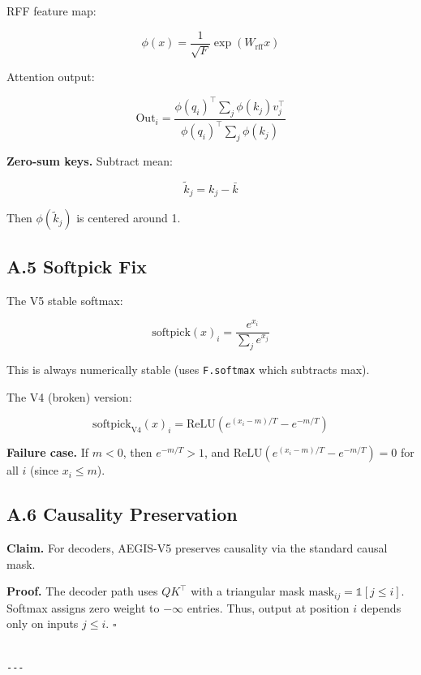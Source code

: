 RFF feature map:

\[
\phi(x) = \frac{1}{\sqrt{F}} \exp(W_\text{rff} x)
\]

Attention output:

\[
\text{Out}_i = \frac{\phi(q_i)^\top \sum_j \phi(k_j) v_j^\top}{\phi(q_i)^\top \sum_j \phi(k_j)}
\]

\textbf{Zero-sum keys.} Subtract mean:

\[
\tilde{k}_j = k_j - \bar{k}
\]

Then $\phi(\tilde{k}_j)$ is centered around 1.

\subsection{A.5 Softpick Fix}

The V5 stable softmax:

\[
\text{softpick}(x)_i = \frac{e^{x_i}}{\sum_j e^{x_j}}
\]

This is always numerically stable (uses \texttt{F.softmax} which subtracts max).

The V4 (broken) version:

\[
\text{softpick}_\text{V4}(x)_i = \text{ReLU}\!\left(e^{(x_i - m)/T} - e^{-m/T}\right)
\]

\textbf{Failure case.} If $m < 0$, then $e^{-m/T} > 1$, and 
$\text{ReLU}(e^{(x_i - m)/T} - e^{-m/T}) = 0$ for all $i$ (since 
$x_i \leq m$).

\subsection{A.6 Causality Preservation}

\textbf{Claim.} For decoders, AEGIS-V5 preserves causality via the standard 
causal mask.

\textbf{Proof.} The decoder path uses $Q K^\top$ with a triangular mask 
$\text{mask}_{ij} = \mathbb{1}[j \leq i]$. Softmax assigns zero weight to 
$-\infty$ entries. Thus, output at position $i$ depends only on inputs 
$j \leq i$. $\square$
\begin{lstlisting}

---
\end{lstlisting}